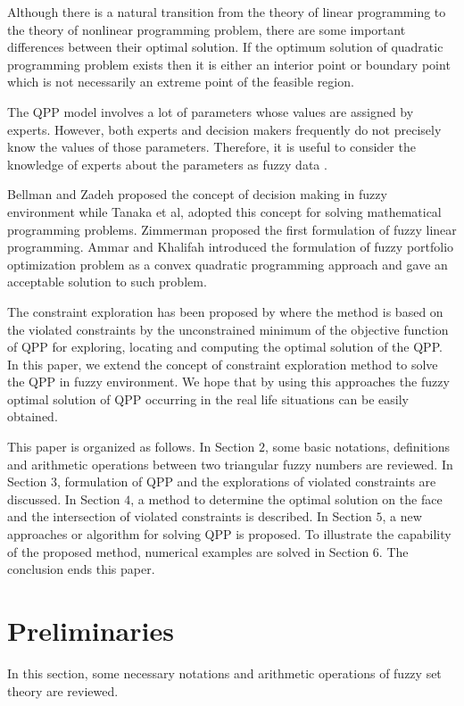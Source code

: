 \documentclass{iaesarticle3}
\begin{document}
Although there is a natural transition from the theory of linear programming to the theory of nonlinear programming problem, there are some important differences between their optimal solution. If the optimum solution of quadratic programming problem exists then it is either an interior point or boundary point which is not necessarily an extreme point of the feasible region.

The QPP model involves a lot of parameters whose values are assigned by experts. However, both experts and decision makers frequently do not precisely know the values of those parameters. Therefore, it is useful to consider the knowledge of experts about the parameters as fuzzy data \cite{zad}.

Bellman and Zadeh \cite{bel} proposed the concept of decision making in fuzzy environment while Tanaka et al, \cite{Tan} adopted this concept for solving mathematical programming problems. Zimmerman \cite{zim} proposed the first formulation of fuzzy linear programming. Ammar and Khalifah \cite{amm} introduced the formulation of fuzzy portfolio optimization problem as a convex quadratic programming approach and gave an acceptable solution to such problem.

The constraint exploration has been proposed by \cite{ism} where the method is based on the violated constraints by the unconstrained minimum of the objective function of QPP for exploring, locating and computing the optimal solution of the QPP. In this paper, we extend the concept of constraint exploration method to solve the QPP in fuzzy environment. We hope that by using this approaches the fuzzy optimal solution of QPP occurring in the real life situations can be easily obtained.

This paper is organized as follows. In Section $2$, some basic notations, definitions and arithmetic operations between two triangular fuzzy numbers are reviewed. In Section $3$, formulation of QPP and the explorations of violated constraints are discussed. In Section $4$, a method to determine the optimal solution on the face and the intersection of violated constraints is described. In Section $5$, a new approaches or algorithm for solving QPP is proposed. To illustrate the capability of the proposed method, numerical examples are solved in Section $6$. The conclusion ends this paper.

\section{Preliminaries}
\label{}
In this section, some necessary notations and arithmetic operations of fuzzy set theory are reviewed.
\end{document}

